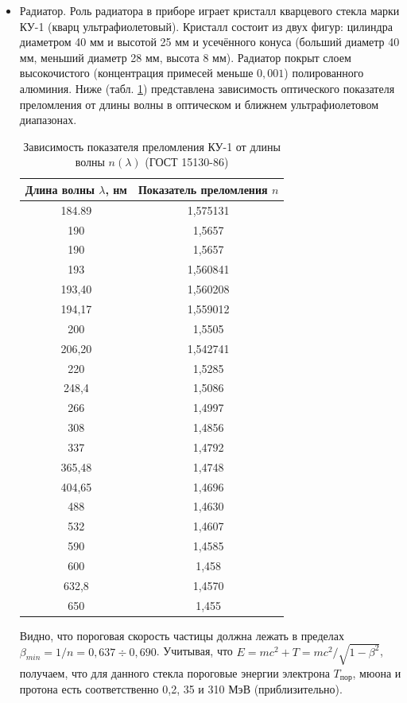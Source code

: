 \documentclass[12pt,a4paper]{report} %
\begin{document}
\begin{itemize}
	\item Радиатор. Роль радиатора в приборе играет кристалл кварцевого стекла марки КУ-1 (кварц ультрафиолетовый). Кристалл состоит из двух фигур: цилиндра диаметром 40 мм и высотой 25 мм и усечённого конуса (больший диаметр 40 мм, меньший диаметр 28 мм, высота 8 мм). Радиатор покрыт слоем высокочистого (концентрация примесей меньше $0,001$) полированного алюминия. Ниже (табл. \ref{tab:optical}) представлена зависимость оптического показателя преломления от длины волны в оптическом и ближнем ультрафиолетовом диапазонах. 
\begin{table}[bh!]
		\caption{\label{tab:optical}Зависимость показателя преломления КУ-1 от длины волны $n(\lambda)$ (ГОСТ 15130-86)}
		\begin{center}
		\begin{tabular}{|c|c|}
		\hline
		Длина волны $\lambda$, нм & Показатель преломления $n$ \\
		\hline
		184.89&1,575131 \\
		190&1,5657 \\
		190 &1,5657 \\
		193&1,560841\\
		193,40&1,560208\\
		194,17&1,559012\\
		200&1,5505\\
		206,20&1,542741\\
		220&1,5285\\
		248,4&1,5086\\
		266&1,4997\\
		308&1,4856\\
		337&1,4792\\
		365,48&1,4748\\
		404,65&1,4696\\
		488&1,4630\\
		532&1,4607\\
		590&1,4585\\
		600&1,458\\
		632,8&1,4570\\
		650&1,455\\
		\hline
		\end{tabular}
		\end{center}
	\end{table} 
Видно, что пороговая скорость частицы должна лежать в пределах $\beta_{min}= 1/n = 0,637 \div 0,690$. Учитывая, что $E=mc^2+T = mc^2/\sqrt{1-\beta^2}$, получаем, что для данного стекла пороговые энергии электрона $T_{пор}$, мюона и протона есть соответственно 0,2, 35 и 310 МэВ (приблизительно).

\end{itemize}
\end{document}
